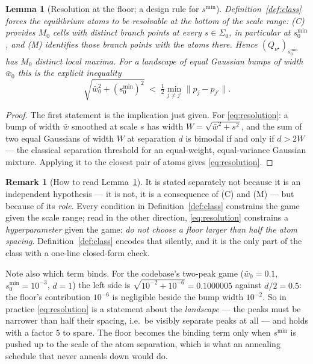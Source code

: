 \documentclass[11pt]{article}
\newtheorem{lemma}{Lemma}
\theoremstyle{definition}
\newtheorem{remark}{Remark}
\begin{document}
\begin{lemma}[Resolution at the floor; a design rule for $s^{\min}$]
\label{lem:resolution}
Definition~\ref{def:class} forces the equilibrium atoms to be resolvable at the
bottom of the scale range: (C) provides $M_0$ cells with distinct branch points
at every $s \in \Sigma_0$, in particular at $s^{\min}_0$, and (M) identifies
those branch points with the atoms there. Hence
$(Q_{\nu^\star})_{s^{\min}_0}$ has $M_0$ distinct local maxima. For a landscape
of equal Gaussian bumps of width $\bar w_0$ this is the explicit inequality
\begin{equation}\label{eq:resolution}
  \sqrt{\bar w_0^2 + (s^{\min}_0)^2} \;<\; \tfrac12
  \min_{j \ne j'} \|p_j - p_{j'}\| .
\end{equation}
\end{lemma}

\begin{proof}
The first statement is the implication just given. For \eqref{eq:resolution}:
a bump of width $\bar w$ smoothed at scale $s$ has width
$W = \sqrt{\bar w^2 + s^2}$, and the sum of two equal Gaussians of width $W$ at
separation $d$ is bimodal if and only if $d > 2W$ --- the classical
separation threshold for an equal-weight, equal-variance Gaussian mixture.
Applying it to the closest pair of atoms gives \eqref{eq:resolution}.
\end{proof}

\begin{remark}[How to read Lemma~\ref{lem:resolution}]\label{rem:resolution}
It is stated separately not because it is an independent hypothesis --- it is
not, it is a consequence of (C) and (M) --- but because of its \emph{role}. Every
condition in Definition~\ref{def:class} constrains the game given the scale
range; read in the other direction, \eqref{eq:resolution} constrains a
\emph{hyperparameter} given the game: \emph{do not choose a floor larger than
half the atom spacing}. Definition~\ref{def:class} encodes that silently, and it
is the only part of the class with a one-line closed-form check.

Note also which term binds. For the codebase's two-peak game
($\bar w_0 = 0.1$, $s^{\min}_0 = 10^{-3}$, $d = 1$) the left side is
$\sqrt{10^{-2} + 10^{-6}} = 0.1000005$ against $d/2 = 0.5$: the floor's
contribution $10^{-6}$ is negligible beside the bump width $10^{-2}$. So in
practice \eqref{eq:resolution} is a statement about the \emph{landscape} --- the
peaks must be narrower than half their spacing, i.e.\ be visibly separate peaks
at all --- and holds with a factor $5$ to spare. The floor becomes the binding
term only when $s^{\min}$ is pushed up to the scale of the atom separation,
which is what an annealing schedule that never anneals down would do.
\end{remark}
\end{document}
